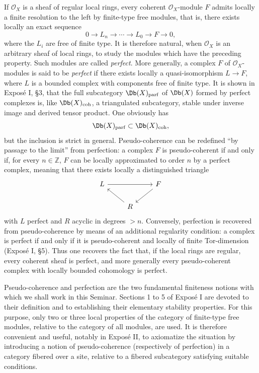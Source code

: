 If \(\mathcal O_X\) is a sheaf of regular local rings, every coherent \(\mathcal O_X\)-module \(F\) admits locally a finite resolution to the left by finite-type free modules, that is, there exists locally an exact sequence
\[
  0\longrightarrow L_n\longrightarrow \cdots \longrightarrow L_0\longrightarrow F\longrightarrow 0,
\]
where the \(L_i\) are free of finite type. It is therefore natural, when \(\mathcal O_X\) is an arbitrary sheaf of local rings, to study the modules which have the preceding property. Such modules are called \emph{perfect}. More generally, a complex \(F\) of \(\mathcal O_X\)-modules is said to be \emph{perfect} if there exists locally a quasi-isomorphism \(L\to F\), where \(L\) is a bounded complex with components free of finite type. It is shown in Exposé I, §3, that the full subcategory \(\Db(X)_{\mathrm{parf}}\) of \(\Db(X)\) formed by perfect complexes is, like \(\Db(X)_{\mathrm{coh}}\), a triangulated subcategory, stable under inverse image and derived tensor product. One obviously has
\[
  \Db(X)_{\mathrm{parf}}\subset \Db(X)_{\mathrm{coh}},
\]
but the inclusion is strict in general. Pseudo-coherence can be redefined ``by passage to the limit'' from perfection: a complex \(F\) is pseudo-coherent if and only if, for every \(n\in\mathbb Z\), \(F\) can be locally approximated to order \(n\) by a perfect complex, meaning that there exists locally a distinguished triangle
\[
\begin{tikzcd}
L \arrow[rr] && F \arrow[dl]\\
& R \arrow[ul] &
\end{tikzcd}
\]
with \(L\) perfect and \(R\) acyclic in degrees \(>n\). Conversely, perfection is recovered from pseudo-coherence by means of an additional regularity condition: a complex is perfect if and only if it is pseudo-coherent and locally of finite Tor-dimension (Exposé I, §5). Thus one recovers the fact that, if the local rings are regular, every coherent sheaf is perfect, and more generally every pseudo-coherent complex with locally bounded cohomology is perfect.

Pseudo-coherence and perfection are the two fundamental finiteness notions with which we shall work in this Seminar. Sections 1 to 5 of Exposé I are devoted to their definition and to establishing their elementary stability properties. For this purpose, only two or three local properties of the category of finite-type free modules, relative to the category of all modules, are used. It is therefore convenient and useful, notably in Exposé II, to axiomatize the situation by introducing a notion of pseudo-coherence (respectively of perfection) in a category fibered over a site, relative to a fibered subcategory satisfying suitable conditions.

